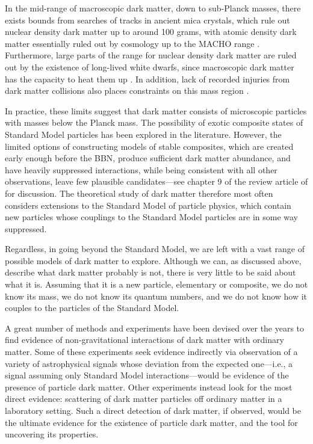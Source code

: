 \documentclass[b5paper, 10pt, twoside]{book}
\begin{document}
In the mid-range of macroscopic dark matter, down to sub-Planck masses, there exists bounds from searches of tracks in ancient mica crystals, which rule out nuclear density dark matter up to around 100 grams, with atomic density dark matter essentially ruled out by cosmology up to the MACHO range \parencite{JacobsStarkmanLynn2015}. Furthermore, large parts of the range for nuclear density dark matter are ruled out by the existence of long-lived white dwarfs, since macroscopic dark matter has the capacity to heat them up \parencite{Graham2018}. In addition, lack of recorded injuries from dark matter collisions also places constraints on this mass region \parencite{SidhuScherrerStarkman2020}.

In practice, these limits suggest that dark matter consists of microscopic particles with masses below the Planck mass. The possibility of exotic composite states of Standard Model particles has been explored in the literature. However, the limited options of constructing models of stable composites, which are created early enough before the BBN, produce sufficient dark matter abundance, and have heavily suppressed interactions, while being consistent with all other observations, leave few plausible candidates---see chapter 9 of the review article of \textcite{CirelliStrumiaZupan2024} for discussion. The theoretical study of dark matter therefore most often considers extensions to the Standard Model of particle physics, which contain new particles whose couplings to the Standard Model particles are in some way suppressed.

Regardless, in going beyond the Standard Model, we are left with a vast range of possible models of dark matter to explore. Although we can, as discussed above, describe what dark matter probably is not, there is very little to be said about what it is. Assuming that it is a new particle, elementary or composite, we do not know its mass, we do not know its quantum numbers, and we do not know how it couples to the particles of the Standard Model.

A great number of methods and experiments have been devised over the years to find evidence of non-gravitational interactions of dark matter with ordinary matter. Some of these experiments seek evidence indirectly via observation of a variety of astrophysical signals whose deviation from the expected one---i.e., a signal assuming only Standard Model interactions---would be evidence of the presence of particle dark matter. Other experiments instead look for the most direct evidence: scattering of dark matter particles off ordinary matter in a laboratory setting. Such a direct detection of dark matter, if observed, would be the ultimate evidence for the existence of particle dark matter, and the tool for uncovering its properties.
\end{document}
